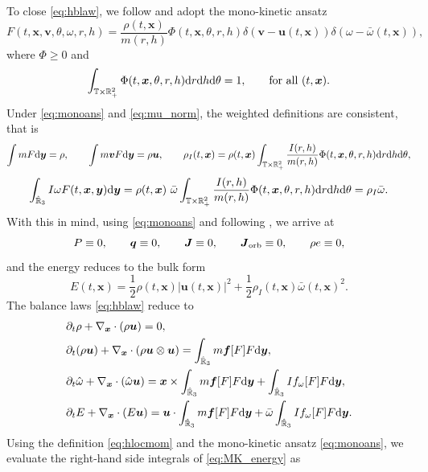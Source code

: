\documentclass[a4paper,11pt]{article}
\numberwithin{equation}{section}
\theoremstyle{definition}
\newcommand{\bfs}[1]{{\boldsymbol #1}}
\newcommand{\bfx}{\boldsymbol{x}}
\newcommand{\bfy}{\boldsymbol{y}}
\newcommand{\bfv}{\boldsymbol{v}}
\newcommand{\bfuu}{\boldsymbol{u}}
\newcommand{\bff}{\boldsymbol{f}}
\newcommand{\bbr}{\mathbb R}
\def\d{{  \rm d}}
\begin{document}
To close \eqref{eq:hblaw}, we follow \cite{deng2025particle,figalli2018rigorous} and adopt the mono-kinetic ansatz
\begin{equation}\label{eq:monoans}
F(t,\bfx,\bfv,\theta,\omega,r,h)
=
\frac{\rho(t,\bfx)}{m(r,h)}\Phi(t,\bfx,\theta, r,h)
\delta(\bfv-\bfuu(t,\bfx))\delta(\omega-\bar\omega(t,\bfx)),
\end{equation}
where $\Phi\ge 0$ and
\begin{equation}\label{eq:mu_norm}
\int_{\mathbb{T}\times \bbr_+^2}\Phi(t,\bfx,\theta,r,h)\d r\d h \d \theta =1, \qquad\text{for all }(t,\bfx).
\end{equation}
Under \eqref{eq:monoans} and \eqref{eq:mu_norm}, the weighted definitions are consistent, that is
\[
\int mF\d\bfy=\rho,\qquad \int m\bfv F\d\bfy=\rho\bfuu,
\qquad 
\rho_I(t,\bfx)=\rho(t,\bfx)\int_{\mathbb{T}\times\bbr_+^2}\frac{I(r,h)}{m(r,h)}\Phi(t,\bfx,\theta,r,h)\d r\d h \d \theta,
\]
\[
\int_{\hat{\bbr}_3} I \omega F(t,\bfx,\bfy) \d\bfy = \rho(t,\bfx)\ \bar\omega\int_{\mathbb{T}\times\bbr_+^2}\frac{I(r,h)}{m(r,h)} \Phi(t,\bfx,\theta,r,h)\d r\d h \d \theta=\rho_I\bar\omega.
\]
%
With this in mind, using \eqref{eq:monoans} and following \cite{deng2025particle}, we arrive at
\[
P\equiv 0,\qquad \bfs{q}\equiv 0,\qquad \bfs{J} \equiv 0,\qquad \bfs{J}_{\rm orb} \equiv 0,\qquad \rho e \equiv 0,
\]
and the energy reduces to the bulk form
\[
E(t,\bfx)=\frac12\rho(t,\bfx)|\bfuu(t,\bfx)|^2+\frac12\rho_I(t,\bfx) \bar\omega(t,\bfx)^2.
\]
The balance laws \eqref{eq:hblaw} reduce to
\begin{subequations}
    \label{eq:MK2H}
\begin{align}
&\partial_t\rho+\nabla_{\bfx}\cdot(\rho\bfuu)=0,\label{eq:MK_mass}\\
&\partial_t(\rho\bfuu)+\nabla_{\bfx}\cdot(\rho\bfuu\otimes\bfuu)=\int_{\hat{\bbr}_3} m \bff[F]F\d\bfy,\label{eq:MK_mom}\\
&\partial_t\hat\omega+\nabla_{\bfx}\cdot(\hat\omega \bfuu )= \bfx\times \int_{\hat{\bbr}_3}  m \bff[F] F\d\bfy + \int_{\hat{\bbr}_3} I f_\omega[F]  F \d\bfy,\label{eq:MK_angmom} \\
&\partial_tE
+\nabla_{\bfx}\cdot(E\bfuu)
=\bfuu\cdot\int_{\hat{\bbr}_3} m \bff[F]F\d \bfy+\bar\omega\int_{\hat{\bbr}_3} I  f_\omega[F]F\d\bfy.
\label{eq:MK_energy}
\end{align}
\end{subequations}
%
Using the definition \eqref{eq:hlocmom} and the mono-kinetic ansatz \eqref{eq:monoans}, we evaluate the right-hand side integrals of \eqref{eq:MK_energy} as
\end{document}
